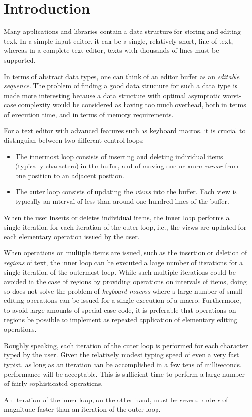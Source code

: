 \section{Introduction}

Many applications and libraries contain a data structure for storing
and editing text.  In a simple input editor, it can be a single,
relatively short, line of text, whereas in a complete text editor,
texts with thousands of lines must be supported.

In terms of abstract data types, one can think of an editor buffer as
an \emph{editable sequence}.  The problem of finding a good data
structure for such a data type is made more interesting because a data
structure with optimal asymptotic worst-case complexity would be
considered as having too much overhead, both in terms of execution
time, and in terms of memory requirements.

For a text editor with advanced features such as keyboard macros, it
is crucial to distinguish between two different control loops:

\begin{itemize}
\item The innermost loop consists of inserting and deleting individual
  items (typically characters) in the buffer, and of moving one or
  more \emph{cursor} from one position to an adjacent position.
\item The outer loop consists of updating the \emph{views} into the
  buffer.  Each view is typically an interval of less than around one
  hundred lines of the buffer.
\end{itemize}

When the user inserts or deletes individual items, the inner loop
performs a single iteration for each iteration of the outer loop,
i.e., the views are updated for each elementary operation issued by
the user.

When operations on multiple items are issued, such as the insertion or
deletion of \emph{regions} of text, the inner loop can be executed a
large number of iterations for a single iteration of the outermost
loop.  While such multiple iterations could be avoided in the case of
regions by providing operations on intervals of items, doing so does
not solve the problem of \emph{keyboard macros} where a large number
of small editing operations can be issued for a single execution of a
macro.  Furthermore, to avoid large amounts of special-case code, it
is preferable that operations on regions be possible to implement as
repeated application of elementary editing operations.

Roughly speaking, each iteration of the outer loop is performed for
each character typed by the user.  Given the relatively modest typing
speed of even a very fast typist, as long as an iteration can be
accomplished in a few tens of milliseconds, performance will be
acceptable.  This is sufficient time to perform a large number of
fairly sophisticated operations.

An iteration of the inner loop, on the other hand, must be several
orders of magnitude faster than an iteration of the outer loop.

